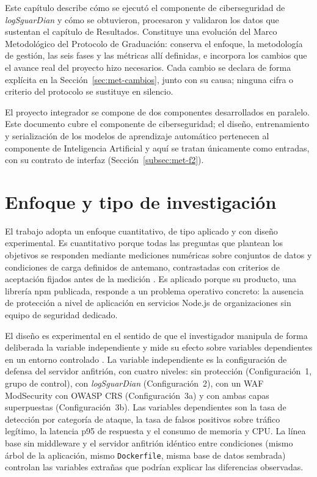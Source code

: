 Este capítulo describe cómo se ejecutó el componente de ciberseguridad de \textit{logSguarDian} y
cómo se obtuvieron, procesaron y validaron los datos que sustentan el capítulo de Resultados.
Constituye una evolución del Marco Metodológico del Protocolo de Graduación: conserva el
enfoque, la metodología de gestión, las seis fases y las métricas allí definidas, e incorpora los
cambios que el avance real del proyecto hizo necesarios. Cada cambio se declara de forma
explícita en la Sección~\ref{sec:met-cambios}, junto con su causa; ninguna cifra o criterio del
protocolo se sustituye en silencio.

El proyecto integrador se compone de dos componentes desarrollados en paralelo. Este documento
cubre el componente de ciberseguridad; el diseño, entrenamiento y serialización de los modelos
de aprendizaje automático pertenecen al componente de Inteligencia Artificial y aquí se tratan
únicamente como entradas, con su contrato de interfaz (Sección~\ref{subsec:met-f2}).

\section{Enfoque y tipo de investigación}
\label{sec:met-enfoque}

El trabajo adopta un enfoque cuantitativo, de tipo aplicado y con diseño experimental. Es
cuantitativo porque todas las preguntas que plantean los objetivos se responden mediante
mediciones numéricas sobre conjuntos de datos y condiciones de carga definidos de antemano,
contrastadas con criterios de aceptación fijados antes de la medición
\cite{hernandez2014}. Es aplicado porque su producto, una librería npm publicada, responde a un
problema operativo concreto: la ausencia de protección a nivel de aplicación en servicios
Node.js de organizaciones sin equipo de seguridad dedicado.

El diseño es experimental en el sentido de que el investigador manipula de forma deliberada la
variable independiente y mide su efecto sobre variables dependientes en un entorno controlado
\cite{hernandez2014}. La variable independiente es la configuración de defensa del servidor
anfitrión, con cuatro niveles: sin protección (Configuración~1, grupo de control), con
\textit{logSguarDian} (Configuración~2), con un WAF ModSecurity con OWASP CRS (Configuración~3a)
y con ambas capas superpuestas (Configuración~3b). Las variables dependientes son la tasa de
detección por categoría de ataque, la tasa de falsos positivos sobre tráfico legítimo, la
latencia p95 de respuesta y el consumo de memoria y CPU. La línea base sin middleware y el
servidor anfitrión idéntico entre condiciones (mismo árbol de la aplicación, mismo
\texttt{Dockerfile}, misma base de datos sembrada) controlan las variables extrañas que podrían explicar las diferencias observadas.

